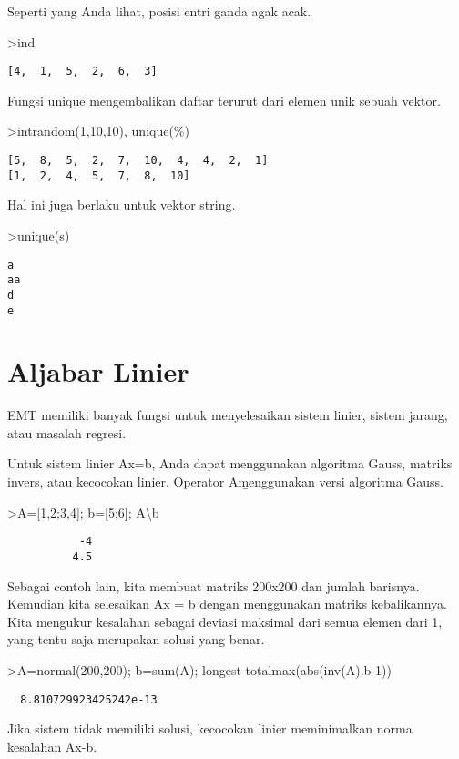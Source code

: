 \documentclass[
]{book}
\begin{document}
Seperti yang Anda lihat, posisi entri ganda agak acak.

\textgreater ind

\begin{verbatim}
[4,  1,  5,  2,  6,  3]
\end{verbatim}

Fungsi unique mengembalikan daftar terurut dari elemen unik sebuah vektor.

\textgreater intrandom(1,10,10), unique(\%)

\begin{verbatim}
[5,  8,  5,  2,  7,  10,  4,  4,  2,  1]
[1,  2,  4,  5,  7,  8,  10]
\end{verbatim}

Hal ini juga berlaku untuk vektor string.

\textgreater unique(s)

\begin{verbatim}
a
aa
d
e
\end{verbatim}

\chapter{Aljabar Linier}\label{aljabar-linier}

EMT memiliki banyak fungsi untuk menyelesaikan sistem linier, sistem jarang, atau masalah regresi.

Untuk sistem linier Ax=b, Anda dapat menggunakan algoritma Gauss, matriks invers, atau kecocokan linier. Operator A\b menggunakan versi algoritma Gauss.

\textgreater A={[}1,2;3,4{]}; b={[}5;6{]}; A\textbackslash b

\begin{verbatim}
           -4 
          4.5 
\end{verbatim}

Sebagai contoh lain, kita membuat matriks 200x200 dan jumlah barisnya. Kemudian kita selesaikan Ax = b dengan menggunakan matriks kebalikannya. Kita mengukur kesalahan sebagai deviasi maksimal dari semua elemen dari 1, yang tentu saja merupakan solusi yang benar.

\textgreater A=normal(200,200); b=sum(A); longest totalmax(abs(inv(A).b-1))

\begin{verbatim}
  8.810729923425242e-13 
\end{verbatim}

Jika sistem tidak memiliki solusi, kecocokan linier meminimalkan norma kesalahan Ax-b.
\end{document}

